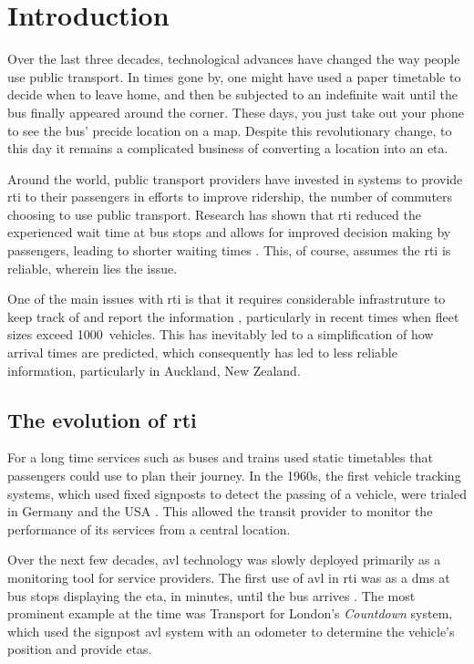 \glsresetall

\chapter{Introduction}
\label{cha:intro}

Over the last three decades, technological advances have changed the way people use public transport. In times gone by, one might have used a paper timetable to decide when to leave home, and then be subjected to an indefinite wait until the bus finally appeared around the corner. These days, you just take out your phone to see the bus' precide location on a map. Despite this revolutionary change, to this day it remains a complicated business of converting a location into an \gls{eta}.


Around the world, public transport providers have invested in systems to provide \gls{rti} to their passengers in efforts to improve ridership, the number of commuters choosing to use public transport. Research has shown that \gls{rti} reduced the experienced wait time at bus stops \citep{TCRP_2003} and allows for improved decision making by passengers, leading to shorter waiting times \citep{Cats_2015,Lu_2017}. This, of course, assumes the \gls{rti} is reliable, wherein lies the issue.


One of the main issues with \gls{rti} is that it requires considerable infrastruture to keep track of and report the information \citep{TCRP_2003b}, particularly in recent times when fleet sizes exceed 1000~vehicles. This has inevitably led to a simplification of how arrival times are predicted, which consequently has led to less reliable information, particularly in Auckland, New Zealand.


\section{The evolution of \acrlong{rti}}
\label{sec:literature}

For a long time \pt{} services such as buses and trains used static timetables that passengers could use to plan their journey. In the 1960s, the first vehicle tracking systems, which used fixed signposts to detect the passing of a vehicle, were trialed in Germany and the USA \citep{TCRP_1997}. This allowed the transit provider to monitor the \rt{} performance of its services from a central location.


Over the next few decades, \gls{avl} technology was slowly deployed primarily as a monitoring tool for service providers. The first use of \gls{avl} in \gls{rti} was as a \gls{dms} at bus stops displaying the \gls{eta}, in minutes, until the bus arrives \citep{TCRP_2003}. The most prominent example at the time was Transport for London's \emph{Countdown} system, which used the signpost \gls{avl} system with an odometer to determine the vehicle's position and provide \glspl{eta}.



